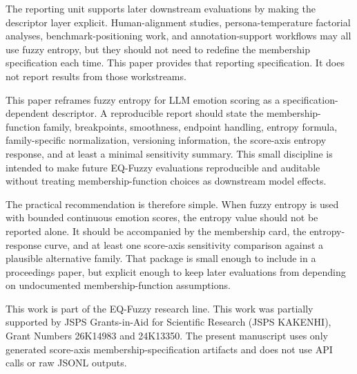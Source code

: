 \documentclass[a4paper,10pt,twocolumn]{myjarticle2}
\begin{document}
The reporting unit supports later downstream evaluations by making the
descriptor layer explicit. Human-alignment studies, persona-temperature
factorial analyses, benchmark-positioning work, and annotation-support
workflows may all use fuzzy entropy, but they should not need to redefine the
membership specification each time. This paper provides that reporting
specification. It does not report results from those workstreams.

This paper reframes fuzzy entropy for LLM emotion scoring as a
specification-dependent descriptor. A reproducible report should state the
membership-function family, breakpoints, smoothness, endpoint handling,
entropy formula, family-specific normalization, versioning information, the
score-axis entropy response, and at least a minimal sensitivity summary. This
small discipline is intended to make future EQ-Fuzzy evaluations reproducible
and auditable without treating membership-function choices as downstream model
effects.

The practical recommendation is therefore simple. When fuzzy entropy is used
with bounded continuous emotion scores, the entropy value should not be
reported alone. It should be accompanied by the membership card, the
entropy-response curve, and at least one score-axis sensitivity comparison
against a plausible alternative family. That package is small enough to include
in a proceedings paper, but explicit enough to keep later evaluations from
depending on undocumented membership-function assumptions.

\vspace{1mm}
\par\noindent

This work is part of the EQ-Fuzzy research line. This work was partially
supported by JSPS Grants-in-Aid for Scientific Research (JSPS KAKENHI), Grant
Numbers 26K14983 and 24K13350. The present manuscript uses only generated
score-axis membership-specification artifacts and does not use API calls or raw
JSONL outputs.
\end{document}
